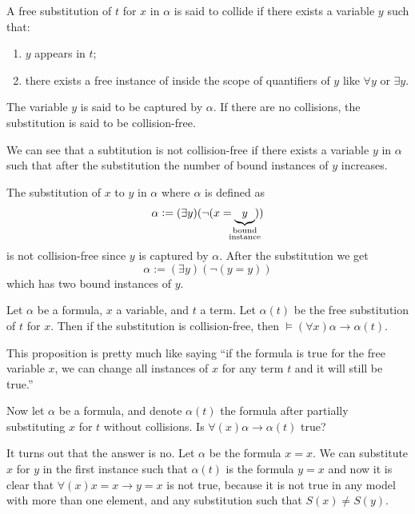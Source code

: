 \documentclass[11pt,a4paper]{article}
\DeclareRobustCommand{\models}{%
  \mathrel{\vDash}%
}
\renewcommand{\implies}{\rightarrow}
\begin{document}
\begin{definition}
  A free substitution of $t$ for $x$ in $\alpha$ is said to collide 
  if there exists a variable $y$ such that:
  \begin{enumerate}
    \item [(1)] $y$ appears in $t$;
    \item [(2)] there exists a free instance of inside the scope of
      quantifiers of $y$ like $\forall y$ or $\exists y$.
  \end{enumerate}
  The variable $y$ is said to be captured by $\alpha$.
  If there are no collisions, the substitution is said to be 
  collision-free.
\end{definition}

\begin{remark}
  We can see that a subtitution is not collision-free if there exists
  a variable $y$ in $\alpha$ such that after the substitution the number
  of bound instances of $y$ increases.
\end{remark}

\begin{example}
  The substitution of $x$ to $y$ in $\alpha$ where $\alpha$ is defined
  as
  \[
    \alpha := (\exists y)(\neg (x = \underbrace{y}_{\mathclap{
    \substack{\text{bound} \\ \text{instance}}}}))
  \]
  is not collision-free since $y$ is captured by $\alpha$.
  After the substitution we get
  \[
    \alpha := (\exists y)(\neg (y = y))
  \]
  which has two bound instances of $y$.
\end{example}

\begin{proposition}
  Let $\alpha$ be a formula, $x$ a variable, and $t$ a term.
  Let $\alpha(t)$ be the free substitution of $t$ for $x$.
  Then if the substitution is collision-free,
  then $\models (\forall x) \alpha \implies \alpha(t)$.
\end{proposition}

This proposition is pretty much like saying ``if the formula is true
for the free variable $x$, we can change all instances of $x$ for
any term $t$ and it will still be true.''

Now let $\alpha$ be a formula, and denote $\alpha(t)$ the formula after
partially substituting $x$ for $t$ without collisions.
Is $\forall(x) \alpha \implies \alpha(t)$ true?

It turns out that the answer is no.
Let $\alpha$ be the formula $x = x$.
We can substitute $x$ for $y$ in the first instance such that
$\alpha(t)$ is the formula $y = x$ and now it is clear that
$\forall(x) x = x \implies y=x$ is not true,
because it is not true in any model with more than one element,
and any substitution such that $S(x) \neq S(y)$.
\end{document}

